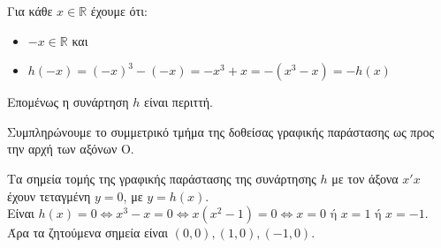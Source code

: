 \begin{alist}
\item 
\begin{rlist}
\item Για κάθε $x \in \mathbb{R}$ έχουμε ότι:
\begin{itemize}
\item $-x \in \mathbb{R}$ και
\item $h(-x) = (-x)^3 - (-x) = -x^3 + x = -(x^3 - x) = -h(x)$
\end{itemize}
Επομένως η συνάρτηση $h$ είναι περιττή.
\item Συμπληρώνουμε το συμμετρικό τμήμα της δοθείσας γραφικής παράστασης ως προς την αρχή των αξόνων O.
\begin{center}
\end{center}
\item Τα σημεία τομής της γραφικής παράστασης της συνάρτησης $h$ με τον άξονα $x'x$ έχουν τεταγμένη $y = 0$, με $y = h(x)$. \\
Είναι $h(x) = 0 \Leftrightarrow x^3 - x = 0 \Leftrightarrow x(x^2 - 1) = 0 \Leftrightarrow x = 0 \text{ ή } x = 1 \text{ ή } x = -1$. \\
Άρα τα ζητούμενα σημεία είναι $(0, 0), (1, 0), (-1, 0)$.
\end{rlist}
\end{alist}

